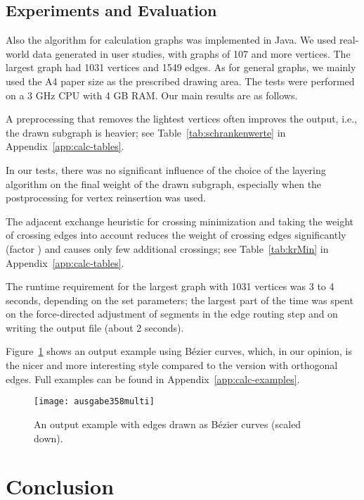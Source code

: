 \documentclass[]{llncs}
\begin{document}
\subsection{Experiments and Evaluation}
Also the algorithm for calculation graphs was implemented in Java. We
used real-world data generated in user studies, with graphs of 107 and
more vertices. The largest graph had 1031 vertices and 1549 edges. As
for general graphs, we mainly used the A4 paper size as the prescribed
drawing area. The tests were performed on a 3 GHz CPU with 4 GB RAM.
Our main results are as follows.
\begin{compactitem}
  \item A preprocessing that removes the lightest vertices often
		improves the output, i.e., the drawn subgraph is heavier; see
		Table~\ref{tab:schrankenwerte} in Appendix~\ref{app:calc-tables}.
  \item In our tests, there was no significant influence of the choice
    of the layering algorithm on the final weight of the drawn
    subgraph, especially when the postprocessing for vertex
    reinsertion was used.
  \item The adjacent exchange heuristic for crossing
    minimization and taking the weight of crossing edges into
    account reduces the weight of crossing edges significantly
    (factor ) and causes only few additional crossings; see
    Table~\ref{tab:krMin} in Appendix~\ref{app:calc-tables}.
  \item The runtime requirement for the largest graph with 1031
    vertices was 3 to 4 seconds, depending on the set parameters; the
    largest part of the time was spent on the force-directed adjustment
    of segments in the edge routing step and on writing the output
    file (about 2 seconds).
\end{compactitem}

Figure~\ref{fig:calc-output-bezier-scaled} shows an output example
using B\'ezier curves, which, in our opinion, is the nicer and more
interesting style compared to the version with orthogonal edges. 
Full examples can be found in Appendix~\ref{app:calc-examples}.
\begin{figure}[tb]
  \centering
  \texttt{[image: ausgabe358multi]}
  \caption{An output example with edges drawn as B\'ezier curves
  (scaled down).}
  \label{fig:calc-output-bezier-scaled}
\end{figure}

\section{Conclusion}
\end{document}
